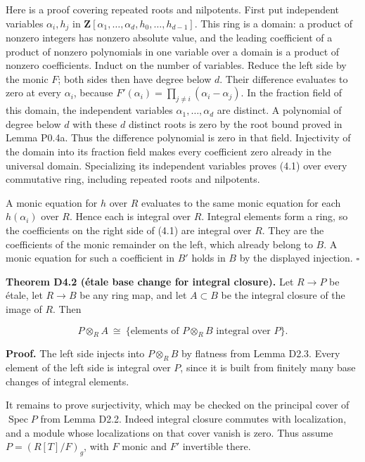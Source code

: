 \documentclass[11pt,a4paper,openany]{report}
\begin{document}
Here is a proof covering repeated roots and nilpotents. First put independent variables \(\alpha_i,h_j\) in \(\mathbf Z[\alpha_1,\ldots,\alpha_d,h_0,\ldots,h_{d-1}]\). This ring is a domain: a product of nonzero integers has nonzero absolute value, and the leading coefficient of a product of nonzero polynomials in one variable over a domain is a product of nonzero coefficients. Induct on the number of variables. Reduce the left side by the monic \(F\); both sides then have degree below \(d\). Their difference evaluates to zero at every \(\alpha_i\), because \(F'(\alpha_i)=\prod_{j\ne i}(\alpha_i-\alpha_j)\). In the fraction field of this domain, the independent variables \(\alpha_1,\ldots,\alpha_d\) are distinct. A polynomial of degree below \(d\) with these \(d\) distinct roots is zero by the root bound proved in Lemma P0.4a. Thus the difference polynomial is zero in that field. Injectivity of the domain into its fraction field makes every coefficient zero already in the universal domain. Specializing its independent variables proves (4.1) over every commutative ring, including repeated roots and nilpotents.

A monic equation for \(h\) over \(R\) evaluates to the same monic equation for each \(h(\alpha_i)\) over \(R\). Hence each is integral over \(R\). Integral elements form a ring, so the coefficients on the right side of (4.1) are integral over \(R\). They are the coefficients of the monic remainder on the left, which already belong to \(B\). A monic equation for such a coefficient in \(B'\) holds in \(B\) by the displayed injection. \(\square\)

\textbf{Theorem D4.2 (étale base change for integral closure).} Let \(R\to P\) be étale, let \(R\to B\) be any ring map, and let \(A\subset B\) be the integral closure of the image of \(R\). Then

\[
P\otimes_RA\ \cong\
\{\text{elements of }P\otimes_RB\text{ integral over }P\}.             \tag{4.2}
\]

\textbf{Proof.} The left side injects into \(P\otimes_RB\) by flatness from Lemma D2.3. Every element of the left side is integral over \(P\), since it is built from finitely many base changes of integral elements.

It remains to prove surjectivity, which may be checked on the principal cover of \(\operatorname{Spec}P\) from Lemma D2.2. Indeed integral closure commutes with localization, and a module whose localizations on that cover vanish is zero. Thus assume \(P=(R[T]/F)_g\), with \(F\) monic and \(F'\) invertible there.
\end{document}
